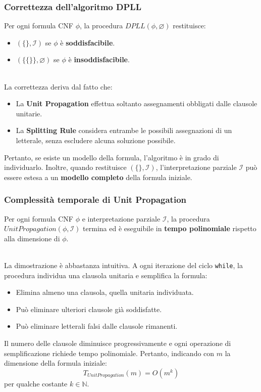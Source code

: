 \subsubsection*{Correttezza dell'algoritmo DPLL}

\colorbox{SALZO}{\parbox{\dimexpr\linewidth-2\fboxsep}{
\begin{theorem}
Per ogni formula CNF $\phi$, la procedura
$DPLL(\phi,\varnothing)$ restituisce:
\begin{itemize}
    \item $(\{\},\mathcal I)$ se $\phi$
    è \textbf{soddisfacibile}.

    \item $(\{\{\}\},\varnothing)$ se $\phi$
    è \textbf{insoddisfacibile}.
\end{itemize}
\end{theorem}
}}\smallskip\\
La correttezza deriva dal fatto che:
\begin{itemize}
    \item La \textbf{Unit Propagation} effettua
    soltanto assegnamenti obbligati dalle
    clausole unitarie.

    \item La \textbf{Splitting Rule} considera
    entrambe le possibili assegnazioni
    di un letterale, senza escludere
    alcuna soluzione possibile.
\end{itemize}
Pertanto, se esiste un modello della formula,
l'algoritmo è in grado di individuarlo.
Inoltre, quando restituisce
$(\{\},\mathcal I)$, l'interpretazione parziale
$\mathcal I$ può essere estesa a un
\textbf{modello completo} della formula iniziale.

\subsubsection*{Complessità temporale di Unit Propagation}
\colorbox{SALZO}{\parbox{\dimexpr\linewidth-2\fboxsep}{
\begin{theorem}
Per ogni formula CNF $\phi$ e interpretazione
parziale $\mathcal I$, la procedura
$UnitPropagation(\phi,\mathcal I)$ termina
ed è eseguibile in \textbf{tempo polinomiale}
rispetto alla dimensione di $\phi$.
\end{theorem}
}}\smallskip\\
La dimostrazione è abbastanza intuitiva.
A ogni iterazione del ciclo \texttt{while},
la procedura individua una clausola unitaria
e semplifica la formula:
\begin{itemize}
    \item Elimina almeno una clausola,
    quella unitaria individuata.

    \item Può eliminare ulteriori clausole
    già soddisfatte.

    \item Può eliminare letterali falsi
    dalle clausole rimanenti.
\end{itemize}
Il numero delle clausole diminuisce
progressivamente e ogni operazione di
semplificazione richiede tempo polinomiale.
Pertanto, indicando con $m$ la dimensione
della formula iniziale:
\[
\boxed{
T_{UnitPropagation}(m)=O(m^k)
}
\]
per qualche costante $k\in\mathbb N$.

